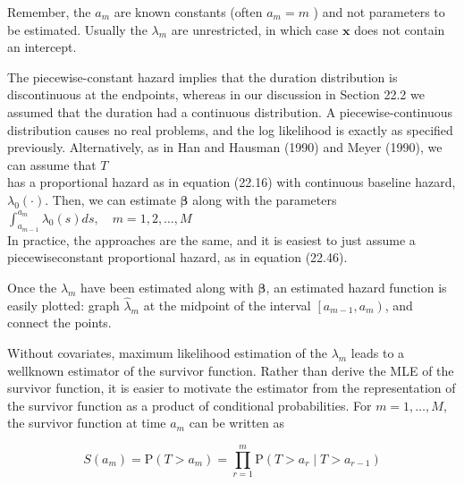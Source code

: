 \documentclass[10pt]{article}
\begin{document}
Remember, the $a_{m}$ are known constants (often $a_{m}=m$ ) and not parameters to be estimated. Usually the $\lambda_{m}$ are unrestricted, in which case $\mathbf{x}$ does not contain an intercept.

The piecewise-constant hazard implies that the duration distribution is discontinuous at the endpoints, whereas in our discussion in Section 22.2 we assumed that the duration had a continuous distribution. A piecewise-continuous distribution causes no real problems, and the log likelihood is exactly as specified previously. Alternatively, as in Han and Hausman (1990) and Meyer (1990), we can assume that $T$\\
has a proportional hazard as in equation (22.16) with continuous baseline hazard, $\lambda_{0}(\cdot)$. Then, we can estimate $\boldsymbol{\beta}$ along with the parameters\\
$\int_{a_{m-1}}^{a_{m}} \lambda_{0}(s) d s, \quad m=1,2, \ldots, M$\\
In practice, the approaches are the same, and it is easiest to just assume a piecewiseconstant proportional hazard, as in equation (22.46).

Once the $\lambda_{m}$ have been estimated along with $\boldsymbol{\beta}$, an estimated hazard function is easily plotted: graph $\hat{\lambda}_{m}$ at the midpoint of the interval $\left[a_{m-1}, a_{m}\right)$, and connect the points.

Without covariates, maximum likelihood estimation of the $\lambda_{m}$ leads to a wellknown estimator of the survivor function. Rather than derive the MLE of the survivor function, it is easier to motivate the estimator from the representation of the survivor function as a product of conditional probabilities. For $m=1, \ldots, M$, the survivor function at time $a_{m}$ can be written as


\begin{equation*}
S\left(a_{m}\right)=\mathrm{P}\left(T>a_{m}\right)=\prod_{r=1}^{m} \mathrm{P}\left(T>a_{r} \mid T>a_{r-1}\right) \tag{22.48}
\end{equation*}
\end{document}
